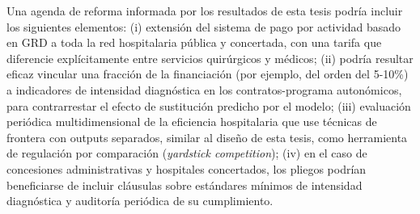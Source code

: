 Una agenda de reforma informada por los resultados de esta tesis podría incluir los siguientes elementos: (i) extensión del sistema de pago por actividad basado en GRD a toda la red hospitalaria pública y concertada, con una tarifa que diferencie explícitamente entre servicios quirúrgicos y médicos; (ii) podría resultar eficaz vincular una fracción de la financiación (por ejemplo, del orden del 5-10\%) a indicadores de intensidad diagnóstica en los contratos-programa autonómicos, para contrarrestar el efecto de sustitución predicho por el modelo; (iii) evaluación periódica multidimensional de la eficiencia hospitalaria que use técnicas de frontera con outputs separados, similar al diseño de esta tesis, como herramienta de regulación por comparación (\textit{yardstick competition}); (iv) en el caso de concesiones administrativas y hospitales concertados, los pliegos podrían beneficiarse de incluir cláusulas sobre estándares mínimos de intensidad diagnóstica y auditoría periódica de su cumplimiento.



